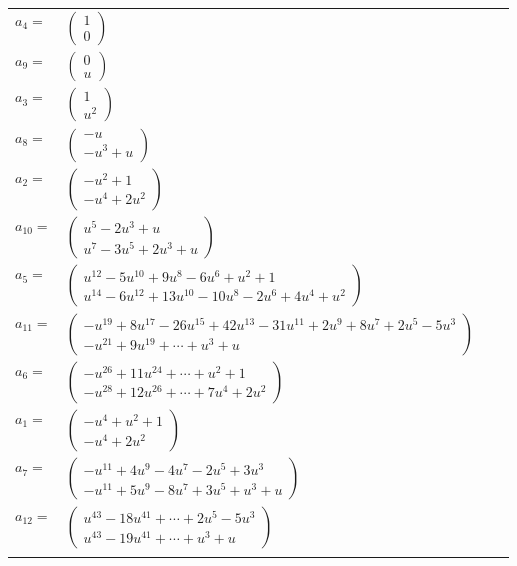 \documentclass[1p]{elsarticle_modified}
\theoremstyle{definition}
\begin{document}
\begin{tabular}{m{7pt} m{180pt} m{7pt} m{180pt} }
\flushright $a_{4}=$&$\begin{pmatrix}1\\0\end{pmatrix}$ \\
\flushright $a_{9}=$&$\begin{pmatrix}0\\u\end{pmatrix}$ \\
\flushright $a_{3}=$&$\begin{pmatrix}1\\u^2\end{pmatrix}$ \\
\flushright $a_{8}=$&$\begin{pmatrix}- u\\- u^3+u\end{pmatrix}$ \\
\flushright $a_{2}=$&$\begin{pmatrix}- u^2+1\\- u^4+2 u^2\end{pmatrix}$ \\
\flushright $a_{10}=$&$\begin{pmatrix}u^5-2 u^3+u\\u^7-3 u^5+2 u^3+u\end{pmatrix}$ \\
\flushright $a_{5}=$&$\begin{pmatrix}u^{12}-5 u^{10}+9 u^8-6 u^6+u^2+1\\u^{14}-6 u^{12}+13 u^{10}-10 u^8-2 u^6+4 u^4+u^2\end{pmatrix}$ \\
\flushright $a_{11}=$&$\begin{pmatrix}- u^{19}+8 u^{17}-26 u^{15}+42 u^{13}-31 u^{11}+2 u^9+8 u^7+2 u^5-5 u^3\\- u^{21}+9 u^{19}+\cdots+u^3+u\end{pmatrix}$ \\
\flushright $a_{6}=$&$\begin{pmatrix}- u^{26}+11 u^{24}+\cdots+u^2+1\\- u^{28}+12 u^{26}+\cdots+7 u^4+2 u^2\end{pmatrix}$ \\
\flushright $a_{1}=$&$\begin{pmatrix}- u^4+u^2+1\\- u^4+2 u^2\end{pmatrix}$ \\
\flushright $a_{7}=$&$\begin{pmatrix}- u^{11}+4 u^9-4 u^7-2 u^5+3 u^3\\- u^{11}+5 u^9-8 u^7+3 u^5+u^3+u\end{pmatrix}$ \\
\flushright $a_{12}=$&$\begin{pmatrix}u^{43}-18 u^{41}+\cdots+2 u^5-5 u^3\\u^{43}-19 u^{41}+\cdots+u^3+u\end{pmatrix}$\\&\end{tabular}
\end{document}

